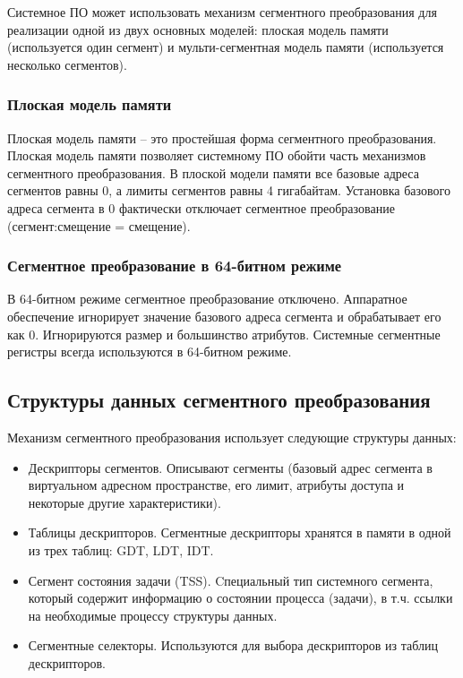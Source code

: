 Системное ПО может использовать механизм сегментного преобразования для реализации одной из двух основных
моделей: плоская модель памяти (используется один сегмент) и мульти-сегментная модель памяти
(используется несколько сегментов).

\subsubsection*{Плоская модель памяти}
Плоская модель памяти -- это простейшая форма сегментного преобразования. Плоская модель памяти позволяет
системному ПО обойти часть механизмов сегментного преобразования. В плоской модели памяти все базовые адреса
сегментов равны 0, а лимиты сегментов равны 4 гигабайтам. Установка базового адреса сегмента в 0 фактически
отключает сегментное преобразование (сегмент:смещение = смещение).

\subsubsection*{Сегментное преобразование в 64-битном режиме}
В 64-битном режиме сегментное преобразование отключено. Аппаратное обеспечение игнорирует значение
базового адреса сегмента и обрабатывает его как 0. Игнорируются размер и большинство атрибутов.
Системные сегментные регистры всегда используются в 64-битном режиме.

\subsection{Структуры данных сегментного преобразования}
Механизм сегментного преобразования использует следующие структуры данных:
\begin{itemize}
\item Дескрипторы сегментов. Описывают сегменты (базовый адрес сегмента в виртуальном
	адресном пространстве, его лимит, атрибуты доступа и некоторые другие характеристики).
\item Таблицы дескрипторов. Сегментные дескрипторы хранятся в памяти в одной из трех таблиц: GDT, LDT, IDT.
\item Сегмент состояния задачи (TSS). Cпециальный тип системного сегмента, который содержит
	информацию о состоянии процесса (задачи), в т.ч. ссылки на необходимые процессу структуры данных.
\item Сегментные селекторы. Используются для выбора дескрипторов из таблиц дескрипторов.
\end{itemize}

